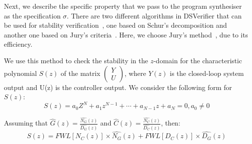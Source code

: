 \documentclass{sig-alternate-05-2015}
\newcommand{\red}[1]{{\color{red}#1}}
\begin{document}
Next, we describe the specific property that we pass to the program
synthesiser as the specification $\sigma$.  There are two different
algorithms in DSVerifier that can be used for stability
verification~\cite{DBLP:journals/dafes/BessaICF16}, one based on
Schur's decomposition and another one based on Jury's
criteria~\cite{astrom1997computer}.  Here, we choose Jury's
method~\cite{astrom1997computer}, due to its efficiency.

We use this method to check the stability in the $z$-domain for the characteristic polynomial $S(z)$ of 
the matrix $\left( \begin{array}{c} Y \\ U \end{array}\right)$, where $Y(z)$ is the 
closed-loop system output and U(z) is the controller output. 
%
We consider the following form for $S(z)$:
%
$$
S(z) = a_0Z^N+a_1z^{N-1}+\cdots+a_{N-1}z+a_N=0, a_0\neq0
$$
%

Assuming that $\hat{G}(z) = \frac{\hat{N_G}(z)}{\hat{D_G}(z)}$
and $\hat{C}(z) = \frac{\hat{N_C}(z)}{\hat{D_C}(z)}$, then:
$$S(z) = FWL[N_C(z)] \times \hat{N_G}(z) + FWL[D_C(z)] \times \hat{D_G}(z)$$
\end{document}

